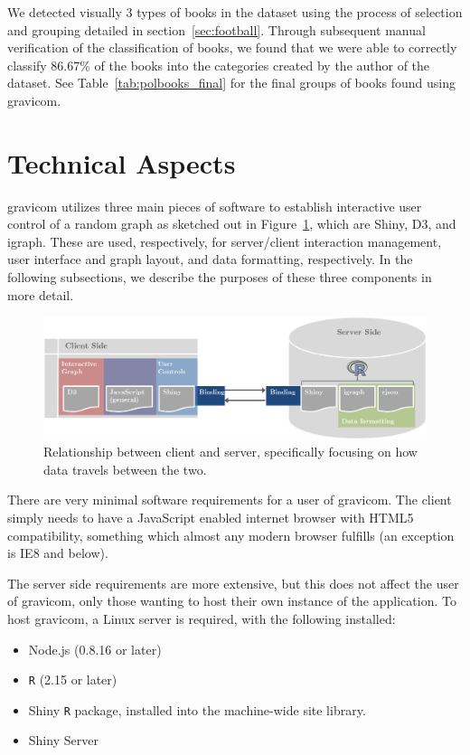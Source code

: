 \documentclass{article}\usepackage[]{graphicx}\usepackage[]{color}
\begin{document}
We detected visually 3 types of books in the dataset using the process of selection and grouping detailed in section~\ref{sec:football}. Through subsequent manual verification of the classification of books, we found that we were able to correctly classify 86.67\% of the books into the categories created by the author of the dataset. See Table~\ref{tab:polbooks_final} for the final groups of books found using gravicom.


\section{Technical Aspects}

gravicom utilizes three main pieces of software to establish interactive user control of a random graph as sketched out in Figure~\ref{fig:clientserver}, which are Shiny, D3, and igraph. These are used, respectively, for server/client interaction management, user interface and graph layout, and data formatting, respectively. In the following subsections, we describe the purposes of these three components in more detail.

\begin{figure}[H]
\centering
\includegraphics[width=\textwidth]{images/clientserverflow.png}
\caption{\label{fig:clientserver} Relationship between client and server, specifically focusing on how data travels between the two.}
\end{figure}

There are very minimal software requirements for a user of gravicom. The client simply needs to have a JavaScript enabled internet browser with HTML5 compatibility, something which almost any modern browser fulfills (an exception is IE8 and below). 

The server side requirements are more extensive, but this does not affect the user of gravicom, only those wanting to host their own instance of the application. To host gravicom, a Linux server is required, with the following installed:

\begin{itemize}
\item Node.js (0.8.16 or later)
\item {\tt R} (2.15 or later)
\item Shiny {\tt R} package, installed into the machine-wide site library. 
\item Shiny Server
\end{itemize}
\end{document}
